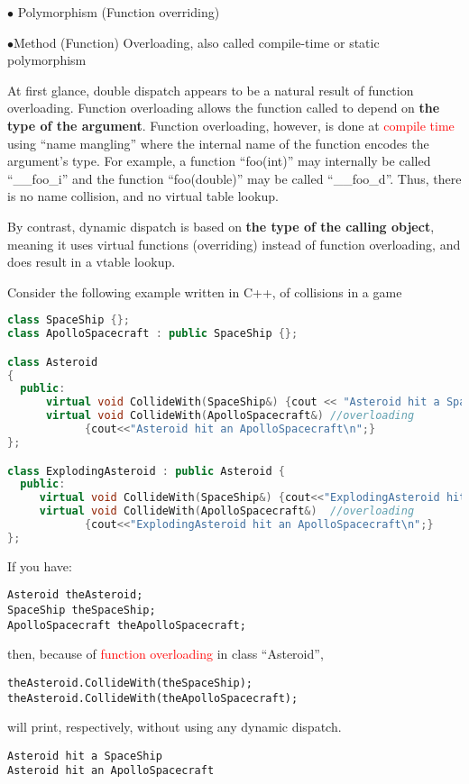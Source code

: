 \documentclass{book}
\begin{document}
$\bullet$ Polymorphism (Function overriding)

$\bullet$Method (Function) Overloading, also called compile-time or static polymorphism

At first glance, double dispatch appears to be a natural result of function overloading. 
Function overloading allows the function called to depend on \textbf{the type of the argument}.
Function overloading, however, is done at \textcolor{red}{compile time} using ``name mangling'' where the internal name of the function encodes the argument's type.
For example, a function ``foo(int)'' may internally be called ``\_\_foo\_i'' and the function ``foo(double)'' may be called ``\_\_foo\_d''. 
Thus, there is no name collision, and no virtual table lookup. 

By contrast, \colorbox{gray!30}{dynamic dispatch} is based on \textbf{the type of the calling object}, meaning it uses virtual functions (overriding) instead of function overloading, and does result in a vtable lookup.

{Consider the following example written in C++, of collisions in a game}

\begin{lstlisting}[caption={sample - collisions in a game}, language=C++]
class SpaceShip {};
class ApolloSpacecraft : public SpaceShip {};

class Asteroid 
{
  public:
      virtual void CollideWith(SpaceShip&) {cout << "Asteroid hit a SpaceShip\n"; }
      virtual void CollideWith(ApolloSpacecraft&) //overloading
            {cout<<"Asteroid hit an ApolloSpacecraft\n";}
};

class ExplodingAsteroid : public Asteroid {
  public:
     virtual void CollideWith(SpaceShip&) {cout<<"ExplodingAsteroid hit a SpaceShip\n";}
     virtual void CollideWith(ApolloSpacecraft&)  //overloading
            {cout<<"ExplodingAsteroid hit an ApolloSpacecraft\n";}
};
\end{lstlisting}%
If you have:
{\color{blue}\begin{verbatim}
Asteroid theAsteroid;
SpaceShip theSpaceShip;
ApolloSpacecraft theApolloSpacecraft;
\end{verbatim}}
then, because of \textcolor{red}{function overloading} in class ``Asteroid'',
\begin{verbatim}
theAsteroid.CollideWith(theSpaceShip); 
theAsteroid.CollideWith(theApolloSpacecraft);
\end{verbatim}
will print, respectively, without using any dynamic dispatch.
{\color{gray}\begin{verbatim}
Asteroid hit a SpaceShip 
Asteroid hit an ApolloSpacecraft
\end{verbatim}}
\end{document}
